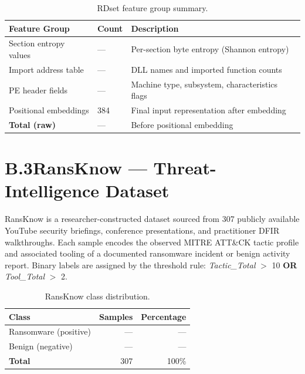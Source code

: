 \begin{table}[ht]
\centering
\caption{RDset feature group summary.}
\label{tab:app_rdset_features}
\begin{tabular}{@{}lll@{}}
\toprule
\textbf{Feature Group} & \textbf{Count} & \textbf{Description} \\
\midrule
Section entropy values   & ---  & Per-section byte entropy (Shannon entropy) \\
Import address table     & ---  & DLL names and imported function counts \\
PE header fields         & ---  & Machine type, subsystem, characteristics flags \\
Positional embeddings    & 384  & Final input representation after embedding \\
\midrule
\textbf{Total (raw)}     & ---  & Before positional embedding \\
\bottomrule
\end{tabular}
\end{table}

\section*{B.3\quad RansKnow — Threat-Intelligence Dataset}

RansKnow is a researcher-constructed dataset sourced from 307 publicly available YouTube
security briefings, conference presentations, and practitioner DFIR walkthroughs.
Each sample encodes the observed MITRE ATT\&CK tactic profile and associated tooling of
a documented ransomware incident or benign activity report.
Binary labels are assigned by the threshold rule:
\textit{Tactic\_Total} $>$ 10 \textbf{OR} \textit{Tool\_Total} $>$ 2.

\begin{table}[ht]
\centering
\caption{RansKnow class distribution.}
\label{tab:app_ransknow_dist}
\begin{tabular}{@{}lrr@{}}
\toprule
\textbf{Class} & \textbf{Samples} & \textbf{Percentage} \\
\midrule
Ransomware (positive)  & ---  & --- \\
Benign (negative)      & ---  & --- \\
\midrule
\textbf{Total}         & 307  & 100\% \\
\bottomrule
\end{tabular}
\end{table}

